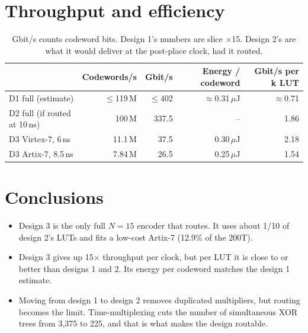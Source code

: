 \documentclass[10pt]{article}
\begin{document}
\section{Throughput and efficiency}
\begin{table}[h]\centering\small
\begin{tabular}{lrrrr}
\toprule
 & Codewords/s & Gbit/s & Energy / codeword & Gbit/s per k LUT \\
\midrule
D1 full (estimate) & $\le$119\,M & $\le$402 & $\approx$0.31\,$\mu$J & $\approx$0.71 \\
D2 full (if routed at 10\,ns) & 100\,M & 337.5 & -- & 1.86 \\
D3 Virtex-7, 6\,ns & 11.1\,M & 37.5 & 0.30\,$\mu$J & 2.18 \\
D3 Artix-7, 8.5\,ns & 7.84\,M & 26.5 & 0.25\,$\mu$J & 1.54 \\
\bottomrule
\end{tabular}
\caption{Gbit/s counts codeword bits. Design 1's numbers are slice $\times$15. Design 2's are what it would deliver at the post-place clock, had it routed.}
\end{table}

\section{Conclusions}
\begin{itemize}
\item Design 3 is the only full $N=15$ encoder that routes. It uses about 1/10 of design 2's LUTs and fits a low-cost Artix-7 (12.9\% of the 200T).
\item Design 3 gives up 15$\times$ throughput per clock, but per LUT it is close to or better than designs 1 and 2. Its energy per codeword matches the design 1 estimate.
\item Moving from design 1 to design 2 removes duplicated multipliers, but routing becomes the limit. Time-multiplexing cuts the number of simultaneous XOR trees from 3,375 to 225, and that is what makes the design routable.
\end{itemize}
\end{document}

